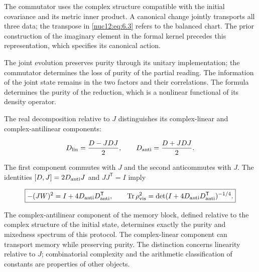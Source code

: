 The commutator uses the complex structure compatible with the initial covariance and its metric inner product. A canonical change jointly transports all three data; the transpose in \eqref{nuc12:eq:6.3} refers to the balanced chart. The prior construction of the imaginary element in the formal kernel precedes this representation, which specifies its canonical action.

The joint evolution preserves purity through its unitary implementation; the commutator determines the loss of purity of the partial reading. The information of the joint state remains in the two factors and their correlations. The formula determines the purity of the reduction, which is a nonlinear functional of its density operator.

The real decomposition relative to \(J\) distinguishes its complex-linear and complex-antilinear components:

\[
D_{\rm lin}=\frac{D-JDJ}{2},\qquad
D_{\rm anti}=\frac{D+JDJ}{2}.
\]

The first component commutes with \(J\) and the second anticommutes with \(J\). The identities \([D,J]=2D_{\rm anti}J\) and \(JJ^{\mathsf T}=I\) imply

\begin{equation}
\boxed{-(JW)^2=I+4D_{\rm anti}D_{\rm anti}^{\mathsf T},\qquad
\operatorname{Tr}\rho_{\rm vis}^2
=\det(I+4D_{\rm anti}D_{\rm anti}^{\mathsf T})^{-1/4}.}
\label{nuc12:eq:6.6}
\end{equation}

The complex-antilinear component of the memory block, defined relative to the complex structure of the initial state, determines exactly the purity and mixedness spectrum of this protocol. The complex-linear component can transport memory while preserving purity. The distinction concerns linearity relative to \(J\); combinatorial complexity and the arithmetic classification of constants are properties of other objects.
